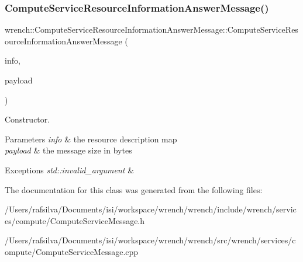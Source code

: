 \subsubsection{\texorpdfstring{Compute\+Service\+Resource\+Information\+Answer\+Message()}{ComputeServiceResourceInformationAnswerMessage()}}
{\footnotesize\ttfamily wrench\+::\+Compute\+Service\+Resource\+Information\+Answer\+Message\+::\+Compute\+Service\+Resource\+Information\+Answer\+Message (\begin{DoxyParamCaption}\item[{std\+::map$<$ std\+::string, std\+::map$<$ std\+::string, double $>$$>$}]{info,  }\item[{double}]{payload }\end{DoxyParamCaption})}



Constructor. 


\begin{DoxyParams}{Parameters}
{\em info} & the resource description map \\
\hline
{\em payload} & the message size in bytes\\
\hline
\end{DoxyParams}

\begin{DoxyExceptions}{Exceptions}
{\em std\+::invalid\+\_\+argument} & \\
\hline
\end{DoxyExceptions}


The documentation for this class was generated from the following files\+:\begin{DoxyCompactItemize}
\item 
/\+Users/rafsilva/\+Documents/isi/workspace/wrench/wrench/include/wrench/services/compute/Compute\+Service\+Message.\+h\item 
/\+Users/rafsilva/\+Documents/isi/workspace/wrench/wrench/src/wrench/services/compute/Compute\+Service\+Message.\+cpp\end{DoxyCompactItemize}
